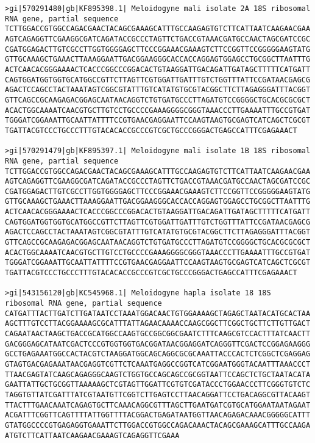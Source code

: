 \documentclass[11pt]{article}
\begin{document}
\begin{Verbatim}[commandchars=\\\{\}]
>gi|570291480|gb|KF895398.1| Meloidogyne mali isolate 2A 18S ribosomal RNA gene, partial sequence
TCTTGGACCGTGGCCAGACGAACTACAGCGAAAGCATTTGCCAAGAGTGTCTTCATTAATCAAGAACGAA
AGTCAGAGGTTCGAAGGCGATCAGATACCGCCCTAGTTCTGACCGTAAACGATGCCAACTAGCGATCCGC
CGATGGAGACTTGTCGCCTTGGTGGGGAGCTTCCCGGAAACGAAAGTCTTCCGGTTCCGGGGGAAGTATG
GTTGCAAAGCTGAAACTTAAAGGAATTGACGGAAGGGCACCACCAGGAGTGGAGCCTGCGGCTTAATTTG
ACTCAACACGGGAAAACTCACCCGGCCCGGACACTGTAAGGATTGACAGATTGATAGCTTTTTCATGATT
CAGTGGATGGTGGTGCATGGCCGTTCTTAGTTCGTGGATTGATTTGTCTGGTTTATTCCGATAACGAGCG
AGACTCCAGCCTACTAAATAGTCGGCGTATTTGTCATATGTGCGTACGGCTTCTTAGAGGGATTTACGGT
GTTCAGCCGCAAGAGACGGAGCAATAACAGGTCTGTGATGCCCTTAGATGTCCGGGGCTGCACGCGCGCT
ACACTGGCAAAATCAACGTGCTTGTCCTGCCCCGAAAGGGGCGGGTAAACCCTTGAAAATTTGCCGTGAT
TGGGATCGGAAATTGCAATTATTTTCCGTGAACGAGGAATTCCAAGTAAGTGCGAGTCATCAGCTCGCGT
TGATTACGTCCCTGCCCTTTGTACACACCGCCCGTCGCTGCCCGGGACTGAGCCATTTCGAGAAACT

>gi|570291479|gb|KF895397.1| Meloidogyne mali isolate 1B 18S ribosomal RNA gene, partial sequence
TCTTGGACCGTGGCCAGACGAACTACAGCGAAAGCATTTGCCAAGAGTGTCTTCATTAATCAAGAACGAA
AGTCAGAGGTTCGAAGGCGATCAGATACCGCCCTAGTTCTGACCGTAAACGATGCCAACTAGCGATCCGC
CGATGGAGACTTGTCGCCTTGGTGGGGAGCTTCCCGGAAACGAAAGTCTTCCGGTTCCGGGGGAAGTATG
GTTGCAAAGCTGAAACTTAAAGGAATTGACGGAAGGGCACCACCAGGAGTGGAGCCTGCGGCTTAATTTG
ACTCAACACGGGAAAACTCACCCGGCCCGGACACTGTAAGGATTGACAGATTGATAGCTTTTTCATGATT
CAGTGGATGGTGGTGCATGGCCGTTCTTAGTTCGTGGATTGATTTGTCTGGTTTATTCCGATAACGAGCG
AGACTCCAGCCTACTAAATAGTCGGCGTATTTGTCATATGTGCGTACGGCTTCTTAGAGGGATTTACGGT
GTTCAGCCGCAAGAGACGGAGCAATAACAGGTCTGTGATGCCCTTAGATGTCCGGGGCTGCACGCGCGCT
ACACTGGCAAAATCAACGTGCTTGTCCTGCCCCGAAAGGGGCGGGTAAACCCTTGAAAATTTGCCGTGAT
TGGGATCGGAAATTGCAATTATTTTCCGTGAACGAGGAATTCCAAGTAAGTGCGAGTCATCAGCTCGCGT
TGATTACGTCCCTGCCCTTTGTACACACCGCCCGTCGCTGCCCGGGACTGAGCCATTTCGAGAAACT

>gi|543156120|gb|KC545968.1| Meloidogyne hapla isolate 18 18S ribosomal RNA gene, partial sequence
CATGATTTACTTGATCTTGATAATCCTAAATGGACAACTGTGGAAAAGCTAGAGCTAATACATGCACTAA
AGCTTTGTCCTTACGGAAAAGCGCATTTATTAGAACAAAACCAAGCGGCTTCGGCTGCTTCTTGTTGACT
CAGAATAACTAAGCTGACCGCATGGCCAAGTGCCGGCGGCGAATCTTTCAAGCGTCCACTTTATCAACTT
GACGGGAGCATAATCGACTCCCGTGGTGGTGACGGATAACGGAGGATCAGGGTTCGACTCCGGAGAAGGG
GCCTGAGAAATGGCCACTACGTCTAAGGATGGCAGCAGGCGCGCAAATTACCCACTCTCGGCTCGAGGAG
GTAGTGACGAGAAATAACGAGGTCGTTCTCAAATGAGGCCGGTCATCGGAATGGGTACAATTTAAACCCT
TTAACGAGTATCAAGCAGAGGGCAAGTCTGGTGCCAGCAGCCGCGGTAATTCCAGCTCTGCTAATACATA
GAATTATTGCTGCGGTTAAAAAGCTCGTAGTTGGATTCGTGTCGATACCCTGGAACCCTTCGGGTGTCTC
TAGGTGTTATCGATTTATCGTAATGTTCGGTCTTGAGTCCTTAACAGGATTCCTGACAGGCGTTACAAGT
TTACTTTGAACAAATCAGAGTGCTTCAAACAGGCGTTTAGCTTGAATGATCGTGCATGGAATAATAGAAT
ACGATTTCGGTTCAGTTTTATTGGTTTTACGGACTGAGATAATGGTTAACAGAGACAAACGGGGGCATTT
GTATGGCCCCGTGAGAGGTGAAATTCTTGGACCGTGGCCAGACAAACTACAGCGAAAGCATTTGCCAAGA
ATGTCTTCATTAATCAAGAACGAAAGTCAGAGGTTCGAAA


\end{Verbatim}
\end{document}
